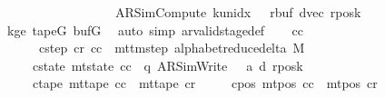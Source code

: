 \begin{isabellebody}
\ \ \ \ \ \ \ \ \ \ \ \ \ \ \ \ \ \ {\isacharparenleft}{\kern0pt}AR{\isacharunderscore}{\kern0pt}SimCompute{\isacharcomma}{\kern0pt}\ k{\isacharunderscore}{\kern0pt}unidx\ {}{\isacharcomma}{\kern0pt}\ {}{\isacharcomma}{\kern0pt}\ {\isacharquery}{\kern0pt}rbuf{\isacharcomma}{\kern0pt}\ dvec{\isacharcomma}{\kern0pt}\ {\isacharquery}{\kern0pt}rposk{\isacharparenright}{\kern0pt}{\isachardoublequoteclose}\isanewline
\ \ \ \ \isamarkupfalse%
\ kge{}\ tapeG\ bufG\ \isamarkupfalse%
\ {\isacharparenleft}{\kern0pt}auto\ simp{\isacharcolon}{\kern0pt}\ ar{\isacharunderscore}{\kern0pt}valid{\isacharunderscore}{\kern0pt}stage{\isacharunderscore}{\kern0pt}def{\isacharparenright}{\kern0pt}\isanewline
\ \ \isamarkupfalse%
\ c{\isacharunderscore}{\kern0pt}c\ \isanewline
\ \ \ \ \ \ c{\isacharunderscore}{\kern0pt}step{\isacharcolon}{\kern0pt}\ {\isachardoublequoteopen}{\isacharparenleft}{\kern0pt}c{\isacharunderscore}{\kern0pt}r{\isacharcomma}{\kern0pt}\ c{\isacharunderscore}{\kern0pt}c{\isacharparenright}{\kern0pt}\ {\isasymin}\ mttm{\isacharunderscore}{\kern0pt}step\ {\isacharparenleft}{\kern0pt}alphabet{\isacharunderscore}{\kern0pt}reduce{\isacharunderscore}{\kern0pt}delta\ M{\isacharparenright}{\kern0pt}{\isachardoublequoteclose}\isanewline
\ \ \ \ \ c{\isacharunderscore}{\kern0pt}state{\isacharcolon}{\kern0pt}\ {\isachardoublequoteopen}mt{\isacharunderscore}{\kern0pt}state\ c{\isacharunderscore}{\kern0pt}c\ {\isacharequal}{\kern0pt}\ {\isacharparenleft}{\kern0pt}q{\isacharprime}{\kern0pt}{\isacharcomma}{\kern0pt}\ AR{\isacharunderscore}{\kern0pt}SimWrite{\isacharcomma}{\kern0pt}\ {}{\isacharcomma}{\kern0pt}\ {}{\isacharcomma}{\kern0pt}\ a{\isacharprime}{\kern0pt}{\isacharcomma}{\kern0pt}\ d{\isacharcomma}{\kern0pt}\ {\isacharquery}{\kern0pt}rposk{\isacharparenright}{\kern0pt}{\isachardoublequoteclose}\isanewline
\ \ \ \ \ c{\isacharunderscore}{\kern0pt}tape{\isacharcolon}{\kern0pt}\ {\isachardoublequoteopen}mt{\isacharunderscore}{\kern0pt}tape\ c{\isacharunderscore}{\kern0pt}c\ {\isacharequal}{\kern0pt}\ mt{\isacharunderscore}{\kern0pt}tape\ c{\isacharunderscore}{\kern0pt}r{\isachardoublequoteclose}\isanewline
\ \ \ \ \ c{\isacharunderscore}{\kern0pt}pos{\isacharcolon}{\kern0pt}\ {\isachardoublequoteopen}mt{\isacharunderscore}{\kern0pt}pos\ c{\isacharunderscore}{\kern0pt}c\ {\isacharequal}{\kern0pt}\ mt{\isacharunderscore}{\kern0pt}pos\ c{\isacharunderscore}{\kern0pt}r{\isachardoublequoteclose}\isanewline

\end{isabellebody}
